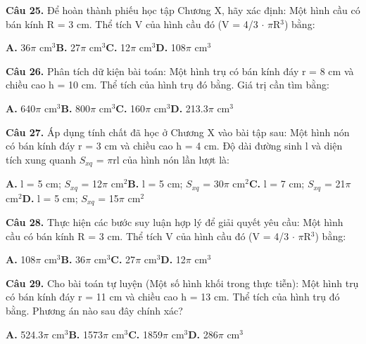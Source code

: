 \documentclass[11pt,a4paper]{article}
\begin{document}
\textbf{\color{primary} Câu 25.} Để hoàn thành phiếu học tập Chương X, hãy xác định: Một hình cầu có bán kính R = 3 cm. Thể tích V của hình cầu đó (V = 4/3 $\cdot$ $\pi$R$^3$) bằng:\par
\hspace*{1.5em}\textbf{A.} 36$\pi$ cm$^3$\quad\quad \textbf{B.} 27$\pi$ cm$^3$\quad\quad \textbf{C.} 12$\pi$ cm$^3$\quad\quad \textbf{D.} 108$\pi$ cm$^3$\par\vspace{2pt}
\textbf{\color{primary} Câu 26.} Phân tích dữ kiện bài toán: Một hình trụ có bán kính đáy r = 8 cm và chiều cao h = 10 cm. Thể tích của hình trụ đó bằng. Giá trị cần tìm bằng:\par
\hspace*{1.5em}\textbf{A.} 640$\pi$ cm$^3$\quad\quad \textbf{B.} 800$\pi$ cm$^3$\quad\quad \textbf{C.} 160$\pi$ cm$^3$\quad\quad \textbf{D.} 213.3$\pi$ cm$^3$\par\vspace{2pt}
\textbf{\color{primary} Câu 27.} Áp dụng tính chất đã học ở Chương X vào bài tập sau: Một hình nón có bán kính đáy r = 3 cm và chiều cao h = 4 cm. Độ dài đường sinh l và diện tích xung quanh $S_{xq}$ = $\pi$rl của hình nón lần lượt là:\par
\hspace*{1.5em}\textbf{A.} l = 5 cm; $S_{xq}$ = 12$\pi$ cm$^2$\quad\quad \textbf{B.} l = 5 cm; $S_{xq}$ = 30$\pi$ cm$^2$\quad\quad \textbf{C.} l = 7 cm; $S_{xq}$ = 21$\pi$ cm$^2$\quad\quad \textbf{D.} l = 5 cm; $S_{xq}$ = 15$\pi$ cm$^2$\par\vspace{2pt}
\textbf{\color{primary} Câu 28.} Thực hiện các bước suy luận hợp lý để giải quyết yêu cầu: Một hình cầu có bán kính R = 3 cm. Thể tích V của hình cầu đó (V = 4/3 $\cdot$ $\pi$R$^3$) bằng:\par
\hspace*{1.5em}\textbf{A.} 108$\pi$ cm$^3$\quad\quad \textbf{B.} 36$\pi$ cm$^3$\quad\quad \textbf{C.} 27$\pi$ cm$^3$\quad\quad \textbf{D.} 12$\pi$ cm$^3$\par\vspace{2pt}
\textbf{\color{primary} Câu 29.} Cho bài toán tự luyện (Một số hình khối trong thực tiễn): Một hình trụ có bán kính đáy r = 11 cm và chiều cao h = 13 cm. Thể tích của hình trụ đó bằng. Phương án nào sau đây chính xác?\par
\hspace*{1.5em}\textbf{A.} 524.3$\pi$ cm$^3$\quad\quad \textbf{B.} 1573$\pi$ cm$^3$\quad\quad \textbf{C.} 1859$\pi$ cm$^3$\quad\quad \textbf{D.} 286$\pi$ cm$^3$\par\vspace{2pt}
\end{document}
